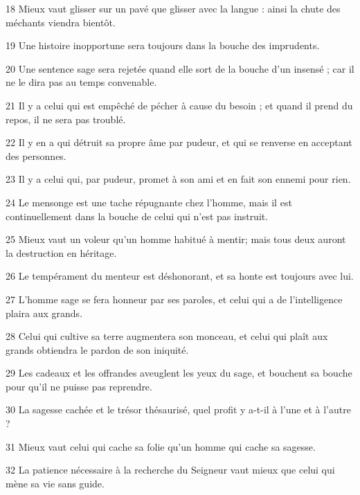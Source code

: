 \par 18 Mieux vaut glisser sur un pavé que glisser avec la langue : ainsi la chute des méchants viendra bientôt.
\par 19 Une histoire inopportune sera toujours dans la bouche des imprudents.
\par 20 Une sentence sage sera rejetée quand elle sort de la bouche d'un insensé ; car il ne le dira pas au temps convenable.
\par 21 Il y a celui qui est empêché de pécher à cause du besoin ; et quand il prend du repos, il ne sera pas troublé.
\par 22 Il y en a qui détruit sa propre âme par pudeur, et qui se renverse en acceptant des personnes.
\par 23 Il y a celui qui, par pudeur, promet à son ami et en fait son ennemi pour rien.
\par 24 Le mensonge est une tache répugnante chez l'homme, mais il est continuellement dans la bouche de celui qui n'est pas instruit.
\par 25 Mieux vaut un voleur qu'un homme habitué à mentir; mais tous deux auront la destruction en héritage.
\par 26 Le tempérament du menteur est déshonorant, et sa honte est toujours avec lui.
\par 27 L'homme sage se fera honneur par ses paroles, et celui qui a de l'intelligence plaira aux grands.
\par 28 Celui qui cultive sa terre augmentera son monceau, et celui qui plaît aux grands obtiendra le pardon de son iniquité.
\par 29 Les cadeaux et les offrandes aveuglent les yeux du sage, et bouchent sa bouche pour qu'il ne puisse pas reprendre.
\par 30 La sagesse cachée et le trésor thésaurisé, quel profit y a-t-il à l'une et à l'autre ?
\par 31 Mieux vaut celui qui cache sa folie qu'un homme qui cache sa sagesse.
\par 32 La patience nécessaire à la recherche du Seigneur vaut mieux que celui qui mène sa vie sans guide.


